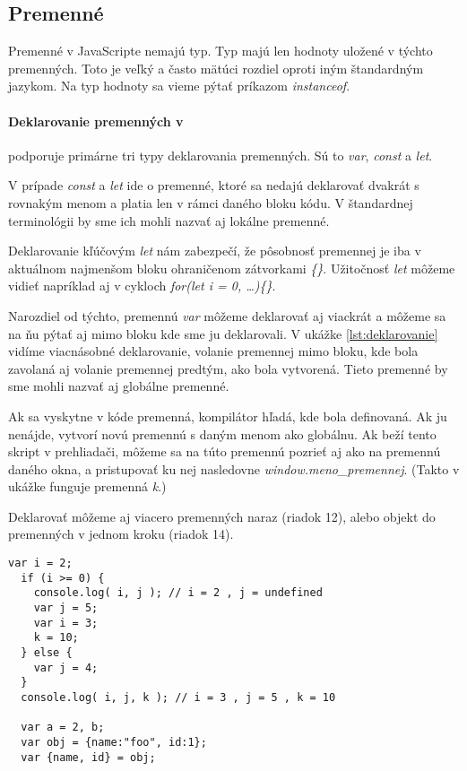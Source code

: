 \subsection{Premenné}
Premenné v JavaScripte nemajú typ.  Typ majú len hodnoty uložené v týchto premenných. Toto je veľký a často mätúci rozdiel oproti iným štandardným jazykom. Na typ hodnoty sa vieme pýtať príkazom \emph{instanceof}.

\paragraph{Deklarovanie premenných v \JS{}}
\JS{} podporuje primárne tri typy deklarovania premenných. Sú to \emph{var}, \emph{const} a \emph{let}. 

V prípade \emph{const} a \emph{let} ide o premenné, ktoré sa nedajú deklarovať dvakrát s rovnakým menom a platia len v rámci daného bloku kódu. V štandardnej terminológii by sme ich mohli nazvať aj lokálne premenné. 

Deklarovanie kľúčovým \emph{let} nám zabezpečí, že pôsobnosť premennej je iba v aktuálnom najmenšom bloku ohraničenom zátvorkami \emph{\{\}}. Užitočnosť \emph{let} môžeme vidieť napríklad aj v cykloch \emph{for(let i = 0, \ldots)\{\}}.

Narozdiel od týchto, premennú \emph{var} môžeme deklarovať aj viackrát a môžeme sa na ňu pýtať aj mimo bloku kde sme ju deklarovali. V ukážke \ref{lst:deklarovanie} vidíme viacnásobné deklarovanie, volanie premennej mimo bloku, kde bola zavolaná aj volanie premennej predtým, ako bola vytvorená. Tieto premenné by sme mohli nazvať aj globálne premenné. 

Ak sa vyskytne v kóde premenná, kompilátor hľadá, kde bola definovaná. Ak ju nenájde, vytvorí novú premennú s daným menom ako globálnu. Ak beží tento skript v prehliadači, môžeme sa na túto premennú pozrieť aj ako na premennú daného okna, a pristupovať ku nej nasledovne \emph{window.meno\_premennej}. (Takto v ukážke funguje premenná \emph{k}.)

Deklarovať môžeme aj viacero premenných naraz (riadok 12), alebo  objekt do premenných v jednom kroku (riadok 14).

\begin{lstlisting}[caption=JavaScript deklarovanie, label={lst:deklarovanie}]
  var i = 2;
  if (i >= 0) {
    console.log( i, j ); // i = 2 , j = undefined
    var j = 5;
    var i = 3;
    k = 10;
  } else {
    var j = 4;
  }
  console.log( i, j, k ); // i = 3 , j = 5 , k = 10

  var a = 2, b;
  var obj = {name:"foo", id:1};
  var {name, id} = obj;
\end{lstlisting}

